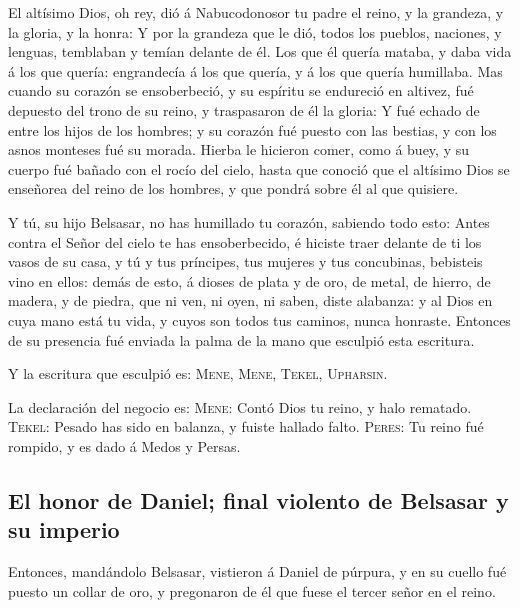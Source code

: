  El altísimo Dios, oh rey, dió á Nabucodonosor tu padre
el reino, y la grandeza, y la gloria, y la honra:  Y por
la grandeza que le dió, todos los pueblos, naciones, y lenguas,
temblaban y temían delante de él. Los que él quería mataba, y daba vida
á los que quería: engrandecía á los que quería, y á los que quería
humillaba.  Mas cuando su corazón se ensoberbeció, y su
espíritu se endureció en altivez, fué depuesto del trono de su reino, y
traspasaron de él la gloria:  Y fué echado de entre los
hijos de los hombres; y su corazón fué puesto con las bestias, y con los
asnos monteses fué su morada. Hierba le hicieron comer, como á buey, y
su cuerpo fué bañado con el rocío del cielo, hasta que conoció que el
altísimo Dios se enseñorea del reino de los hombres, y que pondrá sobre
él al que quisiere.

 Y tú, su hijo Belsasar, no has humillado tu corazón,
sabiendo todo esto:  Antes contra el Señor del cielo te
has ensoberbecido, é hiciste traer delante de ti los vasos de su casa, y
tú y tus príncipes, tus mujeres y tus concubinas, bebisteis vino en
ellos: demás de esto, á dioses de plata y de oro, de metal, de hierro,
de madera, y de piedra, que ni ven, ni oyen, ni saben, diste alabanza: y
al Dios en cuya mano está tu vida, y cuyos son todos tus caminos, nunca
honraste.  Entonces de su presencia fué enviada la palma
de la mano que esculpió esta escritura.

 Y la escritura que esculpió es: \textsc{Mene},
\textsc{Mene}, \textsc{Tekel}, \textsc{Upharsin}.

 La declaración del negocio es: \textsc{Mene}: Contó Dios
tu reino, y halo rematado.  \textsc{Tekel}: Pesado has
sido en balanza, y fuiste hallado falto.  \textsc{Peres}:
Tu reino fué rompido, y es dado á Medos y Persas.

\hypertarget{el-honor-de-daniel-final-violento-de-belsasar-y-su-imperio}{%
\subsection{El honor de Daniel; final violento de Belsasar y su
imperio}\label{el-honor-de-daniel-final-violento-de-belsasar-y-su-imperio}}

 Entonces, mandándolo Belsasar, vistieron á Daniel de
púrpura, y en su cuello fué puesto un collar de oro, y pregonaron de él
que fuese el tercer señor en el reino.

